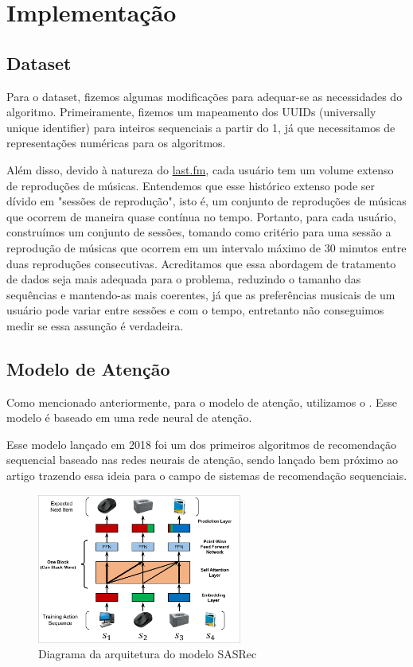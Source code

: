 \section*{Implementação}

\subsection*{Dataset}

Para o dataset, fizemos algumas modificações para adequar-se
as necessidades do algoritmo. Primeiramente, fizemos um
mapeamento dos UUIDs (universally unique identifier) para inteiros
sequenciais a partir do 1, já que necessitamos de representações
numéricas para os algoritmos.

Além disso, devido à natureza do \url{last.fm}, cada usuário tem
um volume extenso de reproduções de músicas. Entendemos que esse
histórico extenso pode ser dívido em "sessões de reprodução", 
isto é, um conjunto de reproduções de músicas que ocorrem de 
maneira quase contínua no tempo. Portanto, para cada usuário,
construímos um conjunto de sessões, tomando como critério para
uma sessão a reprodução de músicas que ocorrem em um intervalo
máximo de 30 minutos entre duas reproduções consecutivas. Acreditamos
que essa abordagem de tratamento de dados seja mais adequada para
o problema, reduzindo o tamanho das sequências e mantendo-as mais
coerentes, já que as preferências musicais de um usuário pode variar
entre sessões e com o tempo, entretanto não conseguimos medir se
essa assunção é verdadeira.

\subsection*{Modelo de Atenção}

Como mencionado anteriormente, para o modelo de atenção, utilizamos
o . Esse modelo é baseado em uma rede neural de
atenção.

Esse modelo lançado em 2018 foi um dos primeiros algoritmos de
recomendação sequencial baseado nas redes neurais de atenção, sendo
lançado bem próximo ao artigo  \cite{attetionisallyouneed}
trazendo essa ideia para o campo de sistemas de recomendação sequenciais.

\begin{figure}[H]
    \centering
    \includegraphics[width=0.6\textwidth]{../assets/sasrec-diagram.png}
    \caption{Diagrama da arquitetura do modelo SASRec \cite{sasrec}}
    \label{fig:sasrec-diagram}
\end{figure}

